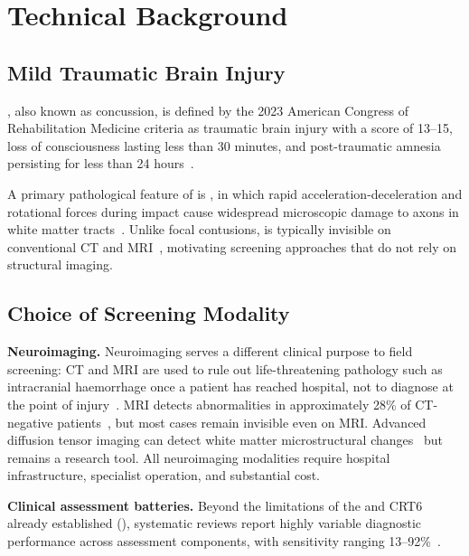\chapter{Technical Background}
\label{chapter:background}

\section{Mild Traumatic Brain Injury}
\label{sec:bg-mtbi}

, also known as concussion, is defined by the 2023 American Congress of Rehabilitation Medicine criteria as traumatic brain injury with a  score of 13--15, loss of consciousness lasting less than 30 minutes, and post-traumatic amnesia persisting for less than 24 hours~\cite{silverberg2023acrm}.

A primary pathological feature of  is , in which rapid acceleration-deceleration and rotational forces during impact cause widespread microscopic damage to axons in white matter tracts~\cite{johnson2013axonal}. Unlike focal contusions,  is typically invisible on conventional CT and MRI~\cite{lee2005neuroimaging, palacios2022dti}, motivating screening approaches that do not rely on structural imaging.


\section{Choice of Screening Modality}
\label{sec:bg-existing}

\textbf{Neuroimaging.} Neuroimaging serves a different clinical purpose to field screening: CT and MRI are used to rule out life-threatening pathology such as intracranial haemorrhage once a patient has reached hospital, not to diagnose  at the point of injury~\cite{stiell2001ct, haydel2000ct}. MRI detects abnormalities in approximately 28\% of CT-negative patients~\cite{yuh2013mri}, but most  cases remain invisible even on MRI. Advanced diffusion tensor imaging can detect white matter microstructural changes~\cite{palacios2022dti} but remains a research tool. All neuroimaging modalities require hospital infrastructure, specialist operation, and substantial cost.

\noindent\textbf{Clinical assessment batteries.} Beyond the limitations of the  and CRT6 already established (), systematic reviews report highly variable diagnostic performance across assessment components, with sensitivity ranging 13--92\%~\cite{nelson2013diagnostic}.

